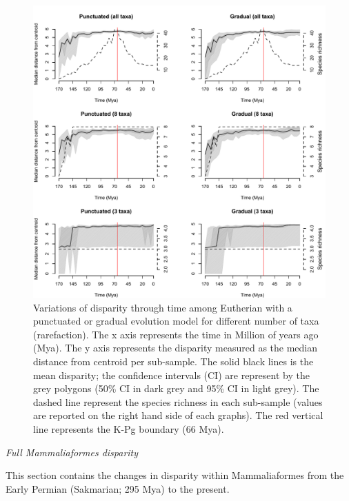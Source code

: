 \documentclass[12pt,letterpaper]{article}
\renewcommand{\subsection}[1]{%
\bigskip
\begin{center}
\begin{large}
\normalfont\itshape #1
\end{large}
\end{center}}
\begin{document}
\begin{figure}[!htbp]
\centering
    \includegraphics[keepaspectratio=true]{Figures/Rarefaction(beck).pdf}
\caption{Variations of disparity through time among Eutherian with a punctuated or gradual evolution model for different number of taxa (rarefaction). The x axis represents the time in Million of years ago (Mya). The y axis represents the disparity measured as the median distance from centroid per sub-sample. The solid black lines is the mean disparity; the confidence intervals (CI) are represent by the grey polygons (50\% CI in dark grey and 95\% CI in light grey). The dashed line represent the species richness in each sub-sample (values are reported on the right hand side of each graphs). The red vertical line represents the K-Pg boundary (66 Mya).}
\end{figure}

\subsection{Full Mammaliaformes disparity}
This section contains the changes in disparity within Mammaliaformes \citep[data from][]{Slater2012MEE} from the Early Permian (Sakmarian; 295 Mya) to the present.
\end{document}

